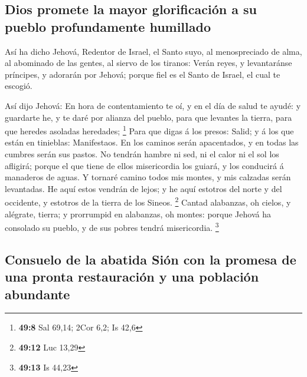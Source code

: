 \hypertarget{dios-promete-la-mayor-glorificaciuxf3n-a-su-pueblo-profundamente-humillado}{%
\subsection{Dios promete la mayor glorificación a su pueblo
profundamente
humillado}\label{dios-promete-la-mayor-glorificaciuxf3n-a-su-pueblo-profundamente-humillado}}

 Así ha dicho Jehová, Redentor de Israel, el Santo suyo,
al menospreciado de alma, al abominado de las gentes, al siervo de los
tiranos: Verán reyes, y levantaránse príncipes, y adorarán por Jehová;
porque fiel es el Santo de Israel, el cual te escogió.

 Así dijo Jehová: En hora de contentamiento te oí, y en el
día de salud te ayudé: y guardarte he, y te daré por alianza del pueblo,
para que levantes la tierra, para que heredes asoladas heredades;
\footnote{\textbf{49:8} Sal 69,14; 2Cor 6,2; Is 42,6} 
Para que digas á los presos: Salid; y á los que están en tinieblas:
Manifestaos. En los caminos serán apacentados, y en todas las cumbres
serán sus pastos.  No tendrán hambre ni sed, ni el calor
ni el sol los afligirá; porque el que tiene de ellos misericordia los
guiará, y los conducirá á manaderos de aguas.  Y tornaré
camino todos mis montes, y mis calzadas serán levantadas.
 He aquí estos vendrán de lejos; y he aquí estotros del
norte y del occidente, y estotros de la tierra de los Sineos.
\footnote{\textbf{49:12} Luc 13,29}  Cantad alabanzas, oh
cielos, y alégrate, tierra; y prorrumpid en alabanzas, oh montes: porque
Jehová ha consolado su pueblo, y de sus pobres tendrá misericordia.
\footnote{\textbf{49:13} Is 44,23}

\hypertarget{consuelo-de-la-abatida-siuxf3n-con-la-promesa-de-una-pronta-restauraciuxf3n-y-una-poblaciuxf3n-abundante}{%
\subsection{Consuelo de la abatida Sión con la promesa de una pronta
restauración y una población
abundante}\label{consuelo-de-la-abatida-siuxf3n-con-la-promesa-de-una-pronta-restauraciuxf3n-y-una-poblaciuxf3n-abundante}}

